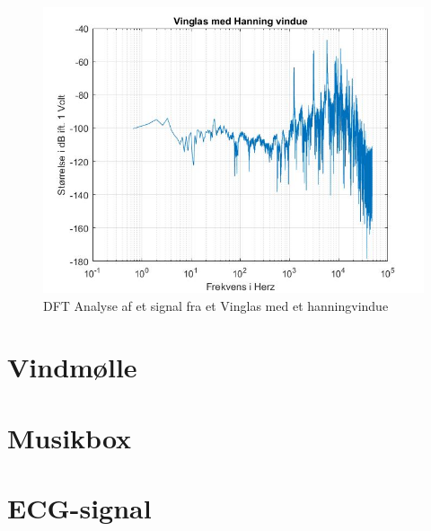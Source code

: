 \begin{figure}[ht!]
	\centering
	\includegraphics[width=180mm]{figures/Vinglas/hanning.jpg}
	\caption{DFT Analyse af et signal fra et Vinglas med et hanningvindue}
	\label{fig:Vinglas hanning}
\end{figure}



\section{Vindmølle}



\section{Musikbox}


\section{ECG-signal}

